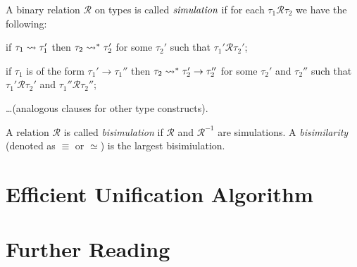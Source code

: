 \begin{defin}
  A binary relation $\mathcal{R}$ on types is called $\emph{simulation}$
  if for each $\tau_1\mathrel{\mathcal{R}} \tau_2$ we have the following:
  \begin{thmenumerate}
  \item if $\tau_1 \leadsto \tau_1'$ then
    $\tau_2 \leadsto^* \tau_2'$
    for some $\tau_2'$
    such that $\tau_1' \mathrel{\mathcal{R}} \tau_2'$;
  \item if $\tau_1$ is of the form $\tau_1' \to \tau_1''$
    then $\tau_2 \leadsto^* \tau_2' \to \tau_2''$
    for some $\tau_2'$ and $\tau_2''$
    such that $\tau_1' \mathrel{\mathcal{R}} \tau_2'$
    and $\tau_1'' \mathrel{\mathcal{R}} \tau_2''$;
  \item \ldots (analogous clauses for other type constructs).
  \end{thmenumerate}
  A relation $\mathcal{R}$ is called \emph{bisimulation}
  if $\mathcal{R}$ and $\mathcal{R}^{-1}$ are simulations.
  A \emph{bisimilarity} (denoted as $\equiv$ or $\simeq$)
  is the largest bisimiulation.
\end{defin}

\section{Efficient Unification Algorithm}

\section{Further Reading}
